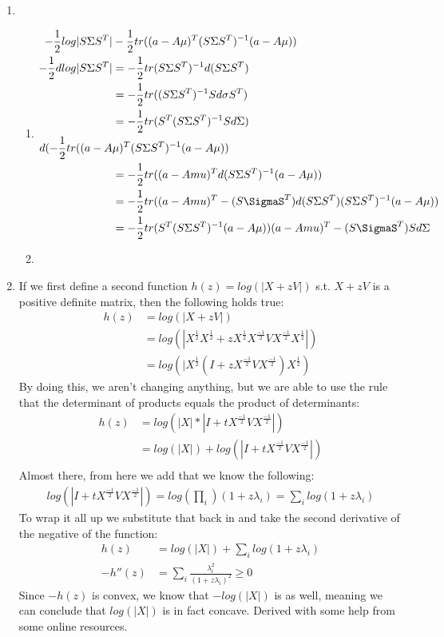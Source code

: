 \documentclass[11pt,a4paper]{article}
\begin{document}
\begin{enumerate}
			\item
			\begin{enumerate}
				\item
				\begin{align*}
				-\frac{1}{2}log\vert S\Sigma S^T \vert &- \frac{1}{2}tr((a-A\mu)^T(S\Sigma S^T)^{-1}(a-A\mu)) \\
				-\frac{1}{2}d log \vert S\Sigma S^T \vert &= -\frac{1}{2}tr(S \Sigma S^T)^{-1}d(S\Sigma S^T) \\
				&= -\frac{1}{2}tr((S \Sigma S^T)^{-1} S d\sigma S^T) \\
				&= -\frac{1}{2} tr(S^T(S \Sigma	S^T)^{-1}S d\Sigma) \\
				d(-\frac{1}{2}tr((a-A&\mu)^T(S\Sigma S^T)^{-1}(a-A\mu))\\
				&= -\frac{1}{2}tr((a-Amu)^T d(S \Sigma S^T)^{-1}(a-A\mu)) \\
				&= -\frac{1}{2}tr((a-Amu)^T -(S\SigmaS^T) d(S \Sigma S^T)(S \Sigma S^T)^{-1}(a-A\mu)) \\
				&= -\frac{1}{2}tr(S^T(S \Sigma S^T)^{-1}(a-A\mu))(a-Amu)^T -(S\SigmaS^T) S d\Sigma
				\end{align*}
				\item 
			\end{enumerate}
			\item If we first define a second function $h(z) = log(|X+zV|)$ s.t. $X+zV$ is a positive definite matrix, then the following holds true:
			\begin{align*}
			h(z) &= log(|X+zV|) \\
			     &= log(|X^\frac{1}{2}X^\frac{1}{2}+zX^\frac{1}{2}X^\frac{-1}{2}VX^\frac{-1}{2}X^\frac{1}{2}|) \\
			     &= log(|X^\frac{1}{2}(I + zX^\frac{-1}{2}VX^\frac{-1}{2})X^\frac{1}{2})
			\end{align*} 
			By doing this, we aren't changing anything, but we are able to use the rule that the determinant of products equals the product of determinants:
			\begin{align*}
			h(z) &= log(|X|*|I + tX^\frac{-1}{2}VX^\frac{-1}{2}|) \\
				&= log(|X|) + log(|I + tX^\frac{-1}{2}VX^\frac{-1}{2}|) \\
			\end{align*}
			Almost there, from here we add that we know the following:
			\begin{align*}
			log(|I + tX^\frac{-1}{2}VX^\frac{-1}{2}|) = log(\prod_i)(1+z\lambda_i) = \sum_i log(1+z\lambda_i)
			\end{align*}
			To wrap it all up we substitute that back in and take the second derivative of the negative of the function:
			\begin{align*}
			h(z) &= log(|X|)+\sum_i log(1+z\lambda_i) \\
			-h''(z) &= \sum_i \frac{\lambda_i^2}{(1+z\lambda_i)^2}\geq 0
			\end{align*}
			Since $-h(z)$ is convex, we know that $-log(|X|)$ is as well, meaning we can conclude that $log(|X|)$ is in fact concave. Derived with some help from some online resources.
		\end{enumerate}
\end{document}
